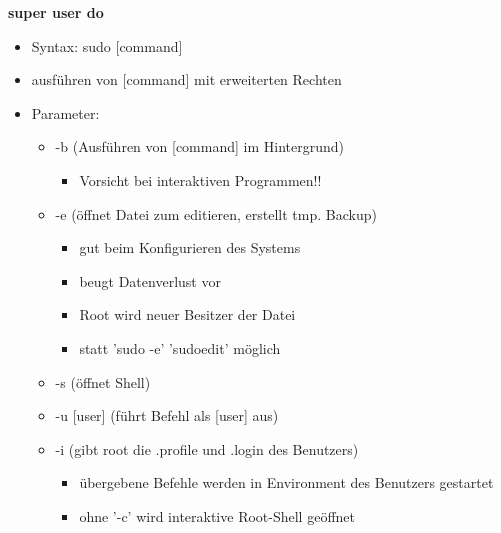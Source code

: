\documentclass[12pt,utf8, 10pt]{article}
\begin{document}
\twocolumn
\scriptsize
\textbf{super user do}
\begin{itemize}
	\item Syntax: sudo [command]
	\item ausführen von [command] mit erweiterten Rechten
	\item Parameter:
	\begin{itemize}
		\item -b (Ausführen von [command] im Hintergrund)
		\begin{itemize}
			\item Vorsicht bei interaktiven Programmen!!
		\end{itemize}
		\item -e (öffnet Datei zum editieren, erstellt tmp. Backup)
		\begin{itemize}
			\item gut beim Konfigurieren des Systems
			\item beugt Datenverlust vor
			\item Root wird neuer Besitzer der Datei
			\item statt 'sudo -e' 'sudoedit' möglich
		\end{itemize}
		\item -s (öffnet Shell)
		\item -u [user] (führt Befehl als [user] aus)
		\item -i (gibt root die .profile und .login des Benutzers)
		\begin{itemize}
			\item übergebene Befehle werden in Environment des Benutzers gestartet
			\item ohne '-c' wird interaktive Root-Shell geöffnet
		\end{itemize}
	\end{itemize}
\end{itemize}
\end{document}
